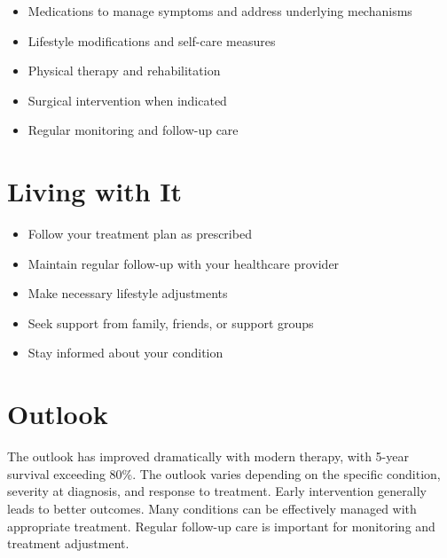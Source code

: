 \begin{itemize}[noitemsep]
  \item Medications to manage symptoms and address underlying mechanisms
  \item Lifestyle modifications and self-care measures
  \item Physical therapy and rehabilitation
  \item Surgical intervention when indicated
  \item Regular monitoring and follow-up care
\end{itemize}
\section{Living with It}
\begin{itemize}[noitemsep]
  \item Follow your treatment plan as prescribed
  \item Maintain regular follow-up with your healthcare provider
  \item Make necessary lifestyle adjustments
  \item Seek support from family, friends, or support groups
  \item Stay informed about your condition
\end{itemize}
\section{Outlook}
The outlook has improved dramatically with modern therapy, with 5-year survival exceeding 80\%. The outlook varies depending on the specific condition, severity at diagnosis, and response to treatment. Early intervention generally leads to better outcomes. Many conditions can be effectively managed with appropriate treatment. Regular follow-up care is important for monitoring and treatment adjustment.
